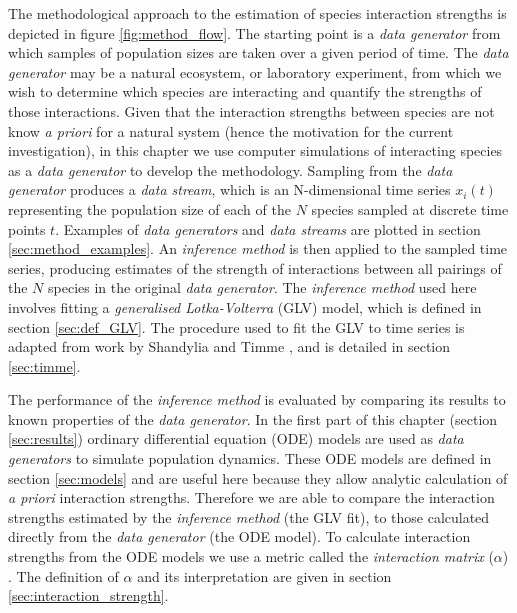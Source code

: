 The methodological approach to the estimation of species interaction strengths is depicted in figure \ref{fig:method_flow}. The starting point is a \emph{data generator} from which samples of population sizes are taken over a given period of time. The \emph{data generator} may be a natural ecosystem, or laboratory experiment, from which we wish to determine which species are interacting and quantify the strengths of those interactions. Given that the interaction strengths between species are not know \emph{a priori} for a natural system (hence the motivation for the current investigation), in this chapter we use computer simulations of interacting species as a \emph{data generator} to develop the methodology. Sampling from the \emph{data generator} produces a \emph{data stream}, which is an N-dimensional time series $x_i(t)$ representing the population size of each of the $N$ species sampled at discrete time points $t$. Examples of \emph{data generators} and \emph{data streams} are plotted in section \ref{sec:method_examples}. An \emph{inference method} is then applied to the sampled time series, producing estimates of the strength of interactions between all pairings of the $N$ species in the original \emph{data generator}. The \emph{inference method} used here involves fitting a \emph{generalised Lotka-Volterra} (GLV) model, which is defined in section \ref{sec:def_GLV}. The procedure used to fit the GLV to time series is adapted from work by Shandylia and Timme \cite{shandilya2011inferring}, and is detailed in section \ref{sec:timme}.

The performance of the \emph{inference method} is evaluated by comparing its results to known properties of the \emph{data generator}. In the first part of this chapter (section \ref{sec:results}) ordinary differential equation (ODE) models are used as \emph{data generators} to simulate population dynamics. These ODE models are defined in section \ref{sec:models} and are useful here because they allow analytic calculation of \emph{a priori} interaction strengths. Therefore we are able to compare the interaction strengths estimated by the \emph{inference method} (the GLV fit), to those calculated directly from the \emph{data generator} (the ODE model). To calculate interaction strengths from the ODE models we use a metric called the \emph{interaction matrix} ($\alpha$) \cite{berlow2004interaction}. The definition of $\alpha$ and its interpretation are given in section \ref{sec:interaction_strength}.

